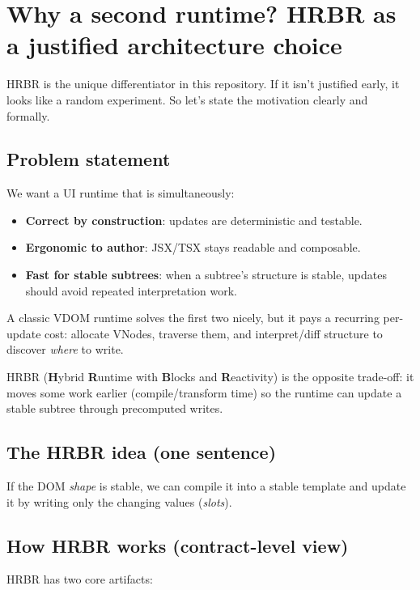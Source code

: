 \section{Why a second runtime? HRBR as a justified architecture choice}

HRBR is the unique differentiator in this repository.
If it isn't justified early, it looks like a random experiment.
So let's state the motivation clearly and formally.

\subsection{Problem statement}

We want a UI runtime that is simultaneously:

\begin{itemize}
  \item \textbf{Correct by construction}: updates are deterministic and testable.
  \item \textbf{Ergonomic to author}: JSX/TSX stays readable and composable.
  \item \textbf{Fast for stable subtrees}: when a subtree's structure is stable, updates should avoid repeated interpretation work.
\end{itemize}

A classic VDOM runtime solves the first two nicely, but it pays a recurring per-update cost:
allocate VNodes, traverse them, and interpret/diff structure to discover \emph{where} to write.

HRBR (\textbf{H}ybrid \textbf{R}untime with \textbf{B}locks and \textbf{R}eactivity) is the opposite trade-off:
it moves some work earlier (compile/transform time) so the runtime can update a stable subtree through precomputed writes.

\subsection{The HRBR idea (one sentence)}

If the DOM \emph{shape} is stable, we can compile it into a stable template and update it by writing only the changing values (\emph{slots}).

\subsection{How HRBR works (contract-level view)}

HRBR has two core artifacts:

